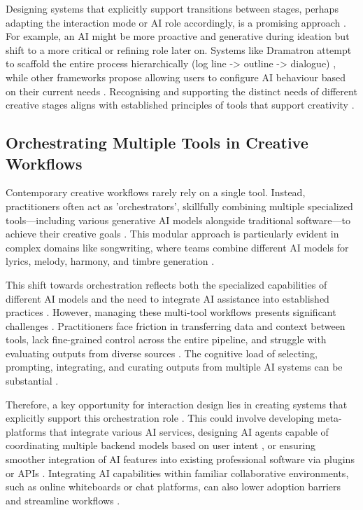 Designing systems that explicitly support transitions between stages, perhaps adapting the interaction mode or AI role accordingly, is a promising approach \cite{Wan2023-he, Ding2024-ta}. For example, an AI might be more proactive and generative during ideation but shift to a more critical or refining role later on. Systems like Dramatron attempt to scaffold the entire process hierarchically (log line -> outline -> dialogue) \cite{Mirowski2023-oz}, while other frameworks propose allowing users to configure AI behaviour based on their current needs \cite{Moruzzi2024-cq}. Recognising and supporting the distinct needs of different creative stages aligns with established principles of tools that support creativity \cite{Resnick2005-fs, Weisz2024-io}.

\subsection{Orchestrating Multiple Tools in Creative Workflows}

Contemporary creative workflows rarely rely on a single tool. Instead, practitioners often act as 'orchestrators', skillfully combining multiple specialized tools—including various generative AI models alongside traditional software—to achieve their creative goals \cite{Palani2024-on}. This modular approach is particularly evident in complex domains like songwriting, where teams combine different AI models for lyrics, melody, harmony, and timbre generation \cite{Huang2020-fh, Uitdenbogerd2023-no}.

This shift towards orchestration reflects both the specialized capabilities of different AI models and the need to integrate AI assistance into established practices \cite{Palani2024-on, Park2024-gw}. However, managing these multi-tool workflows presents significant challenges \cite{Huang2020-fh, Palani2024-on}. Practitioners face friction in transferring data and context between tools, lack fine-grained control across the entire pipeline, and struggle with evaluating outputs from diverse sources \cite{Palani2024-on}. The cognitive load of selecting, prompting, integrating, and curating outputs from multiple AI systems can be substantial \cite{Huang2020-fh, Uitdenbogerd2023-no}.

Therefore, a key opportunity for interaction design lies in creating systems that explicitly support this orchestration role \cite{Palani2024-on}. This could involve developing meta-platforms that integrate various AI services, designing AI agents capable of coordinating multiple backend models based on user intent \cite{Zhang2021-ej, Gottweis2025-kc}, or ensuring smoother integration of AI features into existing professional software via plugins or APIs \cite{Park2024-gw, Huang2020-fh}. Integrating AI capabilities within familiar collaborative environments, such as online whiteboards or chat platforms, can also lower adoption barriers and streamline workflows \cite{Verheijden2023-gn}.

